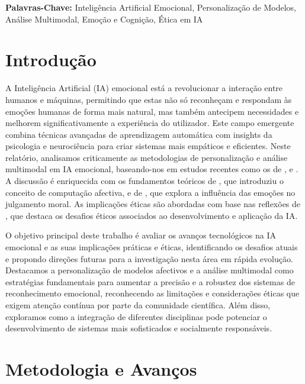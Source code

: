 \documentclass[a4paper,12pt]{report}
\begin{document}
	\vspace{4em}
	
	\noindent\textbf{Palavras-Chave:} \normalsize{Inteligência Artificial Emocional, Personalização de Modelos, Análise Multimodal, Emoção e Cognição, Ética em IA}
	
	\newpage

	
	
	
	\section{Introdução}
	
	A Inteligência Artificial (IA) emocional está a revolucionar a interação entre humanos e máquinas, permitindo que estas não só reconheçam e respondam às emoções humanas de forma mais natural, mas também antecipem necessidades e melhorem significativamente a experiência do utilizador. Este campo emergente combina técnicas avançadas de aprendizagem automática com insights da psicologia e neurociência para criar sistemas mais empáticos e eficientes. Neste relatório, analisamos criticamente as metodologias de personalização e análise multimodal em IA emocional, baseando-nos em estudos recentes como os de \textcite{kargarandehkordi2024}, \textcite{gursesli2024} e \textcite{lee2024}. A discussão é enriquecida com os fundamentos teóricos de \textcite{picard1997}, que introduziu o conceito de computação afectiva, e de \textcite{haidt2001}, que explora a influência das emoções no julgamento moral. As implicações éticas são abordadas com base nas reflexões de \textcite{mueller2020}, que destaca os desafios éticos associados ao desenvolvimento e aplicação da IA.
	
	O objetivo principal deste trabalho é avaliar os avanços tecnológicos na IA emocional e as suas implicações práticas e éticas, identificando os desafios atuais e propondo direções futuras para a investigação nesta área em rápida evolução. Destacamos a personalização de modelos afectivos e a análise multimodal como estratégias fundamentais para aumentar a precisão e a robustez dos sistemas de reconhecimento emocional, reconhecendo as limitações e considerações éticas que exigem atenção contínua por parte da comunidade científica. Além disso, exploramos como a integração de diferentes disciplinas pode potenciar o desenvolvimento de sistemas mais sofisticados e socialmente responsáveis.
	
	\section{Metodologia e Avanços}
	
\end{document}
